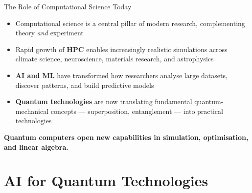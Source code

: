 \documentclass[aspectratio=169]{beamer}
\begin{document}
\begin{frame}{The Role of Computational Science Today}

  \begin{itemize}
    \item Computational science is a central pillar of modern research,
          complementing theory \emph{and} experiment
    \medskip
    \item Rapid growth of \textbf{HPC} enables increasingly realistic
          simulations across climate science, neuroscience, materials
          research, and astrophysics
    \medskip
    \item \textbf{AI and ML} have transformed how researchers analyse
          large datasets, discover patterns, and build predictive models
    \medskip
    \item \textbf{Quantum technologies} are now translating fundamental
          quantum-mechanical concepts — superposition, entanglement —
          into practical technologies
  \end{itemize}

  \bigskip
  \begin{center}
    \textcolor{mqblue}{\bfseries
    Quantum computers open new capabilities in simulation,
    optimisation, and linear algebra.}
  \end{center}

\end{frame}

\section{AI for Quantum Technologies}
\end{document}
